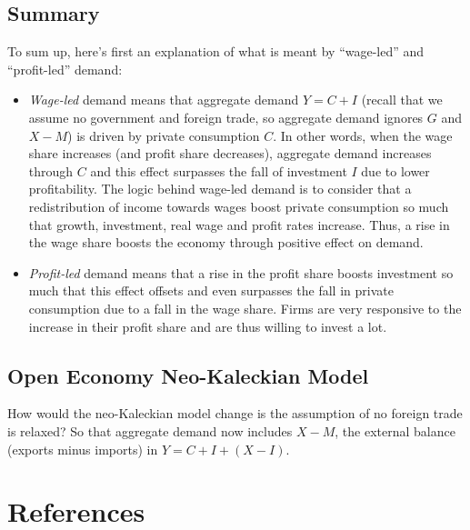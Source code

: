 \documentclass[
  letterpaper,
  DIV=11,
  numbers=noendperiod]{scrreprt}
\begin{document}
\hypertarget{summary}{%
\section{Summary}\label{summary}}

To sum up, here's first an explanation of what is meant by ``wage-led''
and ``profit-led'' demand:

\begin{itemize}
\item
  \emph{Wage-led} demand means that aggregate demand \(Y = C+I\) (recall
  that we assume no government and foreign trade, so aggregate demand
  ignores \(G\) and \(X-M\)) is driven by private consumption \(C\). In
  other words, when the wage share increases (and profit share
  decreases), aggregate demand increases through \(C\) and this effect
  surpasses the fall of investment \(I\) due to lower profitability. The
  logic behind wage-led demand is to consider that a redistribution of
  income towards wages boost private consumption so much that growth,
  investment, real wage and profit rates increase. Thus, a rise in the
  wage share boosts the economy through positive effect on demand.
\item
  \emph{Profit-led} demand means that a rise in the profit share boosts
  investment so much that this effect offsets and even surpasses the
  fall in private consumption due to a fall in the wage share. Firms are
  very responsive to the increase in their profit share and are thus
  willing to invest a lot.
\end{itemize}

\hypertarget{open-economy-neo-kaleckian-model}{%
\section{Open Economy Neo-Kaleckian
Model}\label{open-economy-neo-kaleckian-model}}

How would the neo-Kaleckian model change is the assumption of no foreign
trade is relaxed? So that aggregate demand now includes \(X-M\), the
external balance (exports minus imports) in \(Y = C+I+(X-I)\).


\hypertarget{references}{%
\chapter*{References}\label{references}}
\end{document}
